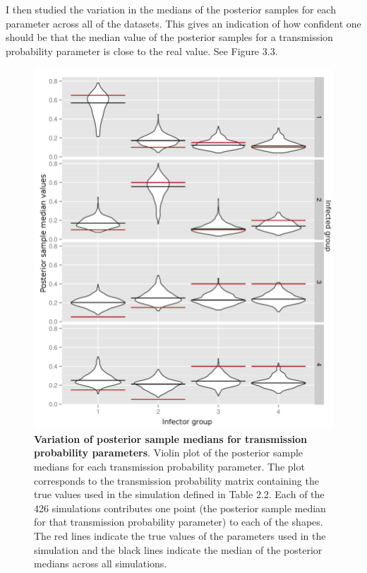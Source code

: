 \documentclass[11pt,a4paper]{report}
\begin{document}
I then studied the variation in the medians of the posterior samples for each parameter across all of the datasets. This gives an indication of how confident one should be that the median value of the posterior samples for a transmission probability parameter is close to the real value. See Figure 3.3.
\begin{figure}[h!]
\centering
\includegraphics[scale=0.7]{violinmat.png} \newline
\caption{{\bf Variation of posterior sample medians for transmission probability parameters}. Violin plot of the posterior sample medians for each transmission probability parameter. The plot corresponds to the transmission probability matrix containing the true values used in the simulation defined in Table 2.2. Each of the 426 simulations contributes one point (the posterior sample median for that transmission probability parameter) to each of the shapes. The red lines indicate the true values of the parameters used in the simulation and the black lines indicate the median of the posterior medians across all simulations.}
\end{figure}
\end{document}
